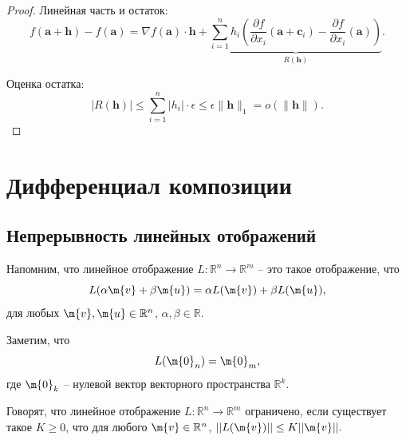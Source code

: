 \begin{proof}
    \item Линейная часть и остаток:
    \[
    f(\mathbf{a} + \mathbf{h}) - f(\mathbf{a}) = \nabla f(\mathbf{a}) \cdot \mathbf{h} + \underbrace{\sum_{i=1}^n h_i \left( \frac{\partial f}{\partial x_i}(\mathbf{a} + \mathbf{c}_i) - \frac{\partial f}{\partial x_i}(\mathbf{a}) \right)}_{R(\mathbf{h})}.
    \]

    \item Оценка остатка:
    \[
    |R(\mathbf{h})| \leq \sum_{i=1}^n |h_i| \cdot \epsilon \leq \epsilon \|\mathbf{h}\|_1 = o(\|\mathbf{h}\|).
    \]
\end{proof}

\section{Дифференциал композиции}


\subsection{Непрерывность линейных отображений}

Напомним, что линейное отображение $L: \mathbb{R}^n \to \mathbb{R}^m$ -- это такое отображение, что
\[
 L(\alpha \m{v} + \beta \m{u}) = \alpha L(\m{v}) + \beta L(\m{u}),
\]
для любых $\m{v}, \m{u} \in \mathbb{R}^n$, $\alpha,\beta \in \mathbb{R}$.

Заметим, что 
\[
 L(\m{0}_n) = \m{0}_m,
\]
где $\m{0}_k$ -- нулевой вектор векторного пространства $\mathbb{R}^k$.


\begin{definition}
    Говорят, что линейное отображение $L: \mathbb{R}^n \to \mathbb{R}^m$ ограничено, если существует такое $K \ge 0$, что для любого $\m{v} \in \mathbb{R}^n$, $|| L(\m{v}) || \le K ||\m{v}||.$
\end{definition}

